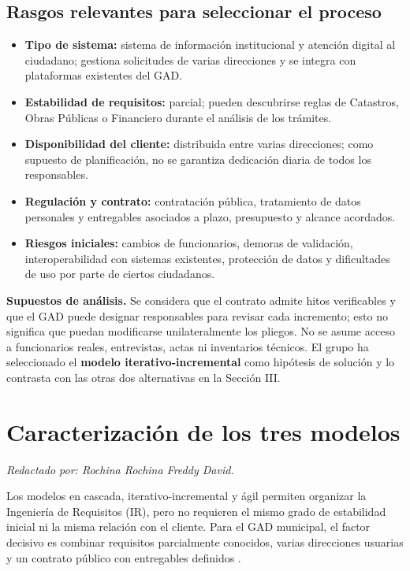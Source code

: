 \documentclass[conference,onecolumn]{IEEEtran}
\begin{document}
\subsection*{Rasgos relevantes para seleccionar el proceso}
\begin{itemize}
    \item \textbf{Tipo de sistema:} sistema de información institucional y atención digital al ciudadano; gestiona solicitudes de varias direcciones y se integra con plataformas existentes del GAD.
    \item \textbf{Estabilidad de requisitos:} parcial; pueden descubrirse reglas de Catastros, Obras Públicas o Financiero durante el análisis de los trámites.
    \item \textbf{Disponibilidad del cliente:} distribuida entre varias direcciones; como supuesto de planificación, no se garantiza dedicación diaria de todos los responsables.
    \item \textbf{Regulación y contrato:} contratación pública, tratamiento de datos personales y entregables asociados a plazo, presupuesto y alcance acordados.
    \item \textbf{Riesgos iniciales:} cambios de funcionarios, demoras de validación, interoperabilidad con sistemas existentes, protección de datos y dificultades de uso por parte de ciertos ciudadanos.
\end{itemize}

\textbf{Supuestos de análisis.} Se considera que el contrato admite hitos verificables y que el GAD puede designar responsables para revisar cada incremento; esto no significa que puedan modificarse unilateralmente los pliegos. No se asume acceso a funcionarios reales, entrevistas, actas ni inventarios técnicos. El grupo ha seleccionado el \textbf{modelo iterativo-incremental} como hipótesis de solución y lo contrasta con las otras dos alternativas en la Sección III.

\section{Caracterización de los tres modelos}
\noindent\textit{Redactado por: Rochina Rochina Freddy David.}\par\smallskip


Los modelos en cascada, iterativo-incremental y ágil permiten organizar la Ingeniería de Requisitos (IR), pero no requieren el mismo grado de estabilidad inicial ni la misma relación con el cliente. Para el GAD municipal, el factor decisivo es combinar requisitos parcialmente conocidos, varias direcciones usuarias y un contrato público con entregables definidos \cite{pohl2025,washizaki2024,buhne2026}.
\end{document}
